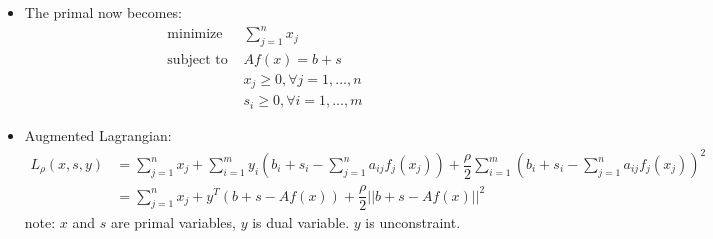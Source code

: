 \documentclass{article}
\begin{document}
\begin{itemize}
\item The primal now becomes:
\begin{align*}
\text{minimize } & \sum\limits_{j=1}^n x_j\\
\text{subject to } & Af(x) = b + s \\
& x_j \ge 0, \forall j=1,\ldots,n \\
& s_i \ge 0, \forall i=1,\ldots,m
\end{align*}

\item Augmented Lagrangian: 
\begin{align*}
L_{\rho}(x,s,y) &= \sum\limits_{j=1}^n x_j + \sum\limits_{i=1}^m y_i(b_i+s_i- \sum\limits_{j=1}^n a_{ij}f_j(x_j)) + \dfrac{\rho}{2} \sum\limits_{i=1}^m \left(b_i + s_i-\sum\limits_{j=1}^n a_{ij}f_j(x_j)\right)^2\\
&= \sum\limits_{j=1}^n x_j + y^T(b + s - Af(x)) + \dfrac{\rho}{2}||b+s - Af(x)||^2
\end{align*}
note: $x$ and $s$ are primal variables, $y$ is dual variable. $y$ is unconstraint. 


\end{itemize}
\end{document}
